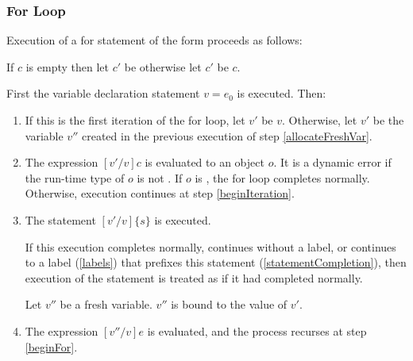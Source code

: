 \documentclass[makeidx]{article}
\begin{document}
{\subsubsection{For Loop}

\LMHash{}%
Execution of a for statement of the form
 proceeds as follows:

\LMHash{}%
If $c$ is empty then let $c'$ be \TRUE{} otherwise let $c'$ be $c$.

\LMHash{}%
First the variable declaration statement \VAR{} $v = e_0$ is executed.
Then:
\begin{enumerate}
\item
\label{beginFor}
If this is the first iteration of the for loop, let $v'$ be $v$.
Otherwise, let $v'$ be the variable $v''$ created in the previous execution of step \ref{allocateFreshVar}.
\item
The expression $[v'/v]c$ is evaluated to an object $o$.
It is a dynamic error if the run-time type of $o$ is not .
If $o$ is \FALSE{}, the for loop completes normally.
Otherwise, execution continues at step \ref{beginIteration}.
\item
\label{beginIteration}
The statement $[v'/v]\{s\}$ is executed.

If this execution completes normally, continues without a label,
or continues to a label (\ref{labels}) that prefixes this \FOR{} statement (\ref{statementCompletion}),
then execution of the statement is treated as if it had completed normally.

\label{allocateFreshVar}
Let $v''$ be a fresh variable.
$v''$ is bound to the value of $v'$.
\item
The expression $[v''/v]e$ is evaluated, and the process recurses at step \ref{beginFor}.
\end{enumerate}


}
\end{document}
